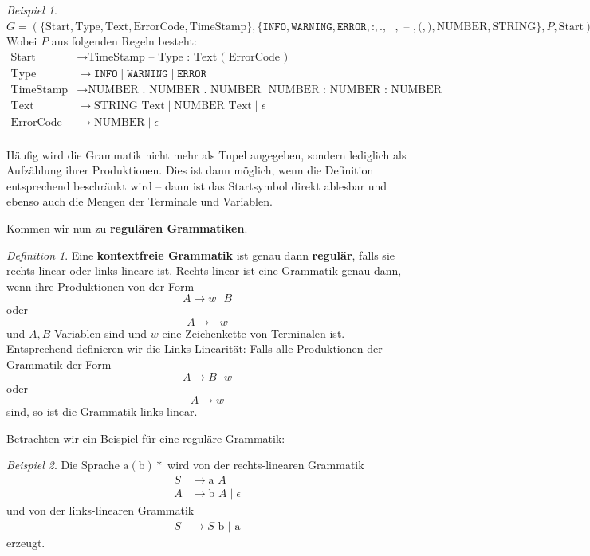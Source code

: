 \documentclass[11pt,a4paper]{scrreport}
\theoremstyle{remark}
\theoremstyle{custom}
\newtheorem{definition}{Definition}[section]
\newtheorem{example}{Beispiel}[section]
\begin{document}
\begin{example}
$
G = (\{\text{Start}, \text{Type}, \text{Text}, \text{ErrorCode}, \text{TimeStamp}\}, \{\texttt{INFO}, \texttt{WARNING}, \texttt{ERROR}, \allowbreak \texttt{:}, \texttt{.}, \texttt{ }, \texttt{ -- }, \texttt{(}, \texttt{)}, \text{NUMBER}, \allowbreak \text{STRING}\}, P, \text{Start}) $ \\
Wobei $P$ aus folgenden Regeln besteht:
\begin{align*}
\text{Start} &\rightarrow \text{TimeStamp} \texttt{ -- } \text{Type} \texttt{ : } \text{Text} \texttt{ ( } \text{ErrorCode} \texttt{ ) } \\
\text{Type} &\rightarrow \texttt{INFO} \mid \texttt{WARNING} \mid \texttt{ERROR} \\
\text{TimeStamp} &\rightarrow \text{NUMBER} \texttt{ . } \text{NUMBER} \text{ . } \text{NUMBER} \texttt{ } \text{NUMBER} \texttt{ : } \text{NUMBER} \texttt{ : } \text{NUMBER} \\
\text{Text} &\rightarrow \text{STRING } \text{Text} \mid \text{NUMBER } \text{Text} \mid \epsilon \\
\text{ErrorCode} &\rightarrow \text{NUMBER} \mid \epsilon
\end{align*} \\
Häufig wird die Grammatik nicht mehr als Tupel angegeben, sondern lediglich als Aufzählung ihrer Produktionen. Dies ist dann möglich, wenn die Definition entsprechend beschränkt wird -- dann ist das Startsymbol direkt ablesbar und ebenso auch die Mengen der Terminale und Variablen.
\end{example}
Kommen wir nun zu \textbf{regulären Grammatiken}.
\begin{definition}
Eine \textbf{kontextfreie Grammatik} ist genau dann \textbf{regulär}, falls sie rechts-linear oder links-lineare ist. Rechts-linear ist eine Grammatik genau dann, wenn ihre Produktionen von der Form
\[A \rightarrow w\text{ }B\] oder \[A \rightarrow\text{ }w\] und $A, B$ Variablen sind und $w$ eine Zeichenkette von Terminalen ist. Entsprechend definieren wir die Links-Linearität: Falls alle Produktionen der Grammatik der Form
\[A \rightarrow B\text{ }w\] oder \[A \rightarrow w\] sind, so ist die Grammatik links-linear.
\end{definition}
Betrachten wir ein Beispiel für eine reguläre Grammatik:
\begin{example}
Die Sprache $\text{a}(\text{b})*$ wird von der rechts-linearen Grammatik 
\begin{align*}
S &\rightarrow \text{a } A \\
A &\rightarrow \text{b } A \mid \epsilon
\end{align*}
und von der links-linearen Grammatik
\begin{align*}
S &\rightarrow S \text{ b } | \text{ a}
\end{align*}
erzeugt.
\end{example}
\end{document}
